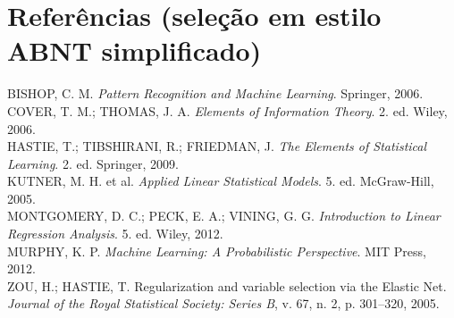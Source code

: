 \documentclass[12pt,a4paper]{article}
\begin{document}
\section*{Referências (seleção em estilo ABNT simplificado)}
BISHOP, C. M. \textit{Pattern Recognition and Machine Learning}. Springer, 2006.\\
COVER, T. M.; THOMAS, J. A. \textit{Elements of Information Theory}. 2. ed. Wiley, 2006.\\
HASTIE, T.; TIBSHIRANI, R.; FRIEDMAN, J. \textit{The Elements of Statistical Learning}. 2. ed. Springer, 2009.\\
KUTNER, M. H. et al. \textit{Applied Linear Statistical Models}. 5. ed. McGraw-Hill, 2005.\\
MONTGOMERY, D. C.; PECK, E. A.; VINING, G. G. \textit{Introduction to Linear Regression Analysis}. 5. ed. Wiley, 2012.\\
MURPHY, K. P. \textit{Machine Learning: A Probabilistic Perspective}. MIT Press, 2012.\\
ZOU, H.; HASTIE, T. Regularization and variable selection via the Elastic Net. \textit{Journal of the Royal Statistical Society: Series B}, v. 67, n. 2, p. 301--320, 2005.
\end{document}
